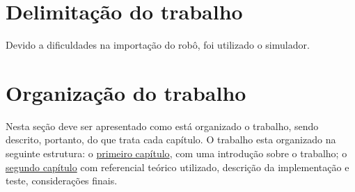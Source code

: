 \section{Delimitação do trabalho}

Devido a dificuldades na importação do robô, foi utilizado o simulador.


\section{Organização do trabalho}

Nesta seção deve ser apresentado como está organizado o trabalho, sendo
descrito, portanto, do que trata cada capítulo.
O trabalho esta organizado na seguinte estrutura: o \hyperref[cap:introducao]{primeiro capítulo}, com uma introdução sobre o trabalho; o \hyperref[cap:refencial]{segundo capítulo} com referencial teórico utilizado, descrição da implementação e teste, considerações finais.
